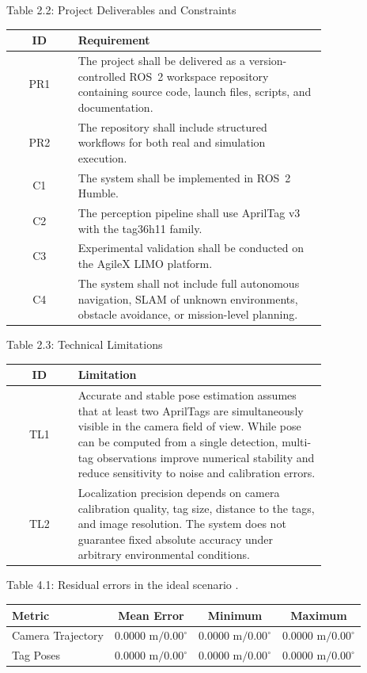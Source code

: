 \begin{frame}[label=appendix-table-22]{Table 2.2: Project Deliverables and Constraints}
\scriptsize
\centering
\begin{tabular}{|c|p{0.79\linewidth}|}
\hline
\textbf{ID} & \textbf{Requirement} \\ \hline
PR1 & The project shall be delivered as a version-controlled ROS~2 workspace repository containing source code, launch files, scripts, and documentation. \\ \hline
PR2 & The repository shall include structured workflows for both real and simulation execution. \\ \hline
C1 & The system shall be implemented in ROS~2 Humble. \\ \hline
C2 & The perception pipeline shall use AprilTag v3 with the tag36h11 family. \\ \hline
C3 & Experimental validation shall be conducted on the AgileX LIMO platform. \\ \hline
C4 & The system shall not include full autonomous navigation, SLAM of unknown environments, obstacle avoidance, or mission-level planning. \\ \hline
\end{tabular}
\end{frame}

\begin{frame}[label=appendix-table-23]{Table 2.3: Technical Limitations}
\scriptsize
\centering
\begin{tabular}{|c|p{0.79\linewidth}|}
\hline
\textbf{ID} & \textbf{Limitation} \\ \hline
TL1 & Accurate and stable pose estimation assumes that at least two AprilTags are simultaneously visible in the camera field of view. While pose can be computed from a single detection, multi-tag observations improve numerical stability and reduce sensitivity to noise and calibration errors. \\ \hline
TL2 & Localization precision depends on camera calibration quality, tag size, distance to the tags, and image resolution. The system does not guarantee fixed absolute accuracy under arbitrary environmental conditions. \\ \hline
\end{tabular}
\end{frame}

\begin{frame}[label=appendix-table-41]{Table 4.1: Residual errors in the ideal scenario .}
\small
\centering
\begin{tabular}{|l|c|c|c|}
\hline
\textbf{Metric} & \textbf{Mean Error} & \textbf{Minimum} & \textbf{Maximum} \\ \hline
Camera Trajectory & $0.0000\text{ m} / 0.00^\circ$ & $0.0000\text{ m} / 0.00^\circ$ & $0.0000\text{ m} / 0.00^\circ$ \\ \hline
Tag Poses & $0.0000\text{ m} / 0.00^\circ$ & $0.0000\text{ m} / 0.00^\circ$ & $0.0000\text{ m} / 0.00^\circ$ \\ \hline
\end{tabular}
\end{frame}

